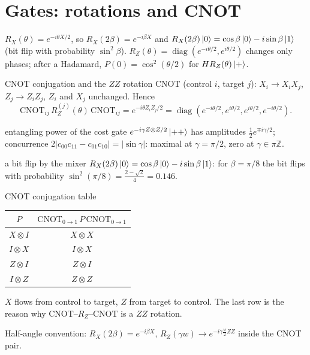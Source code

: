 \documentclass[11pt,a4paper,openany]{book}
\newcounter{wex}[chapter]
\begin{document}
\section{Gates: rotations and CNOT}
$R_X(\theta) = e^{-i\theta X/2}$, so $R_X(2\beta) = e^{-i\beta X}$ and $R_X(2\beta)\ket0 = \cos\beta\ket0 - i\sin\beta\ket1$ (bit flip with
probability $\sin^2\beta$). $R_Z(\theta) = \operatorname{diag}(e^{-i\theta/2}, e^{i\theta/2})$ changes only phases; after a Hadamard,
$P(0) = \cos^2(\theta/2)$ for $HR_Z(\theta)\ket+$.

\begin{keyres}{CNOT conjugation and the $ZZ$ rotation}
CNOT (control $i$, target $j$): $X_i \to X_iX_j$, $Z_j \to Z_iZ_j$, $Z_i$ and $X_j$ unchanged. Hence
\[ \mathrm{CNOT}_{ij}\,R_Z^{(j)}(\theta)\,\mathrm{CNOT}_{ij} = e^{-i\theta Z_iZ_j/2} = \operatorname{diag}(e^{-i\theta/2}, e^{i\theta/2}, e^{i\theta/2}, e^{-i\theta/2}). \]
\end{keyres}
\begin{wexample}{entangling power of the cost gate}
$e^{-i\gamma Z\otimes Z/2}\ket{++}$ has amplitudes $\frac12e^{\mp i\gamma/2}$; concurrence $2|c_{00}c_{11} - c_{01}c_{10}| = |\sin\gamma|$: maximal at
$\gamma = \pi/2$, zero at $\gamma \in \pi\mathbb Z$.
\end{wexample}

\begin{wexample}{a bit flip by the mixer}
$R_X(2\beta)\ket0 = \cos\beta\ket0 - i\sin\beta\ket1$: for $\beta = \pi/8$ the bit flips with probability $\sin^2(\pi/8) = \frac{2 - \sqrt2}{4} = 0.146$.
\end{wexample}
\begin{wexample}{CNOT conjugation table}
\begin{center}\small
\begin{tabular}{cc}
\toprule $P$ & $\mathrm{CNOT}_{0\to1}\,P\,\mathrm{CNOT}_{0\to1}$\\ \midrule
$X\otimes I$ & $X\otimes X$\\ $I\otimes X$ & $I\otimes X$\\ $Z\otimes I$ & $Z\otimes I$\\ $I\otimes Z$ & $Z\otimes Z$\\ \bottomrule
\end{tabular}
\end{center}
$X$ flows from control to target, $Z$ from target to control. The last row is the reason why CNOT--$R_Z$--CNOT is a $ZZ$ rotation.
\end{wexample}
\begin{checklist}
Half-angle convention: $R_X(2\beta) = e^{-i\beta X}$, $R_Z(\gamma w) \to e^{-i\gamma\frac w2 ZZ}$ inside the CNOT pair.
\end{checklist}
\end{document}
